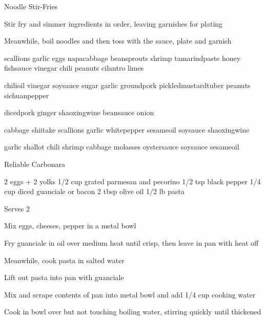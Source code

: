 \begin{densecard}{Noodle Stir-Fries}{}
\begin{steps}
    \item Stir fry and simmer ingredients in order, leaving garnishes for plating
    \item Meanwhile, boil noodles and then toss with the sauce, plate and garnish
\end{steps}
\begin{paracol}{3}
 scallions garlic eggs napa\ijoin{}cabbage bean\ijoin{}sprouts shrimp tamarind\ijoin{}paste honey fish\ijoin{}sauce vinegar chili peanuts cilantro limes

 chili\ijoin{}oil vinegar soy\ijoin{}sauce sugar garlic ground\ijoin{}pork pickled\ijoin{}mustard\ijoin{}tuber peanuts
sichuan\ijoin{}pepper

\nextcolumn
{} diced\ijoin{}pork ginger shaoxing\ijoin{}wine bean\ijoin{}sauce onion

 cabbage shiitake scallions garlic white\ijoin{}pepper sesame\ijoin{}oil soy\ijoin{}sauce shaoxing\ijoin{}wine

\nextcolumn
{} garlic shallot chili shrimp cabbage molasses oyster\ijoin{}sauce soy\ijoin{}sauce sesame\ijoin{}oil
\end{paracol}
\end{densecard}

\begin{recipe}{Reliable Carbonara}{}
\begin{ingredients}
2 eggs + 2 yolks
1/2 cup grated parmesan and pecorino
1/2 tsp black pepper
1/4 cup diced guanciale or bacon
2 tbsp olive oil
1/2 lb pasta
\end{ingredients}
\nextcolumn
Serves 2
\begin{steps}
    \item Mix eggs, cheeses, pepper in a metal bowl
    \item Fry guanciale in oil over medium heat until crisp, then leave in pan with heat off
    \item Meanwhile, cook pasta in salted water
    \item Lift out pasta into pan with guanciale
    \item Mix and scrape contents of pan into metal bowl and add 1/4 cup cooking water
    \item Cook in bowl over but not touching boiling water, stirring quickly until thickened
\end{steps}
\end{recipe}

